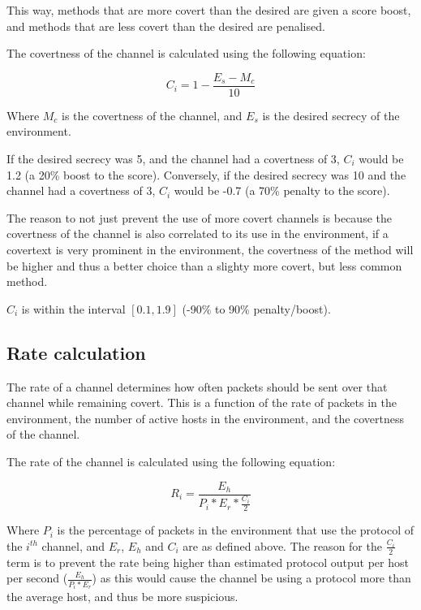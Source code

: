 This way, methods that are more covert than the desired are given a score boost, and methods that are less covert than the desired are penalised.

The covertness of the channel is calculated using the following equation:

\begin{equation}
    C_i = 1 - \frac{E_s - M_c}{10}
\end{equation}

Where $M_c$ is the covertness of the channel, and $E_s$ is the desired secrecy of the environment.

If the desired secrecy was 5, and the channel had a covertness of 3, $C_i$ would be 1.2 (a 20\% boost to the score). Conversely, if the desired secrecy was 10 and the channel had a covertness of 3, $C_i$ would be -0.7 (a 70\% penalty to the score).

The reason to not just prevent the use of more covert channels is because the covertness of the channel is also correlated to its use in the environment, if a covertext is very prominent in the environment, the covertness of the method will be higher and thus a better choice than a slighty more covert, but less common method.

$C_i$ is within the interval $[0.1, 1.9]$ (-90\% to 90\% penalty/boost).

\subsection{Rate calculation}

The rate of a channel determines how often packets should be sent over that channel while remaining covert. This is a function of the rate of packets in the environment, the number of active hosts in the environment, and the covertness of the channel.

The rate of the channel is calculated using the following equation:

\begin{equation}
    R_i = \frac{E_h}{P_i * E_r * \frac{C_i}{2} }
\end{equation}

Where $P_i$ is the percentage of packets in the environment that use the protocol of the $i^{th}$ channel, and $E_r$, $E_h$ and $C_i$ are as defined above. The reason for the $\frac{C_i}{2}$ term is to prevent the rate being higher than estimated protocol output per host per second ($\frac{E_h}{P_i * E_r}$) as this would cause the channel be using a protocol more than the average host, and thus be more suspicious.

